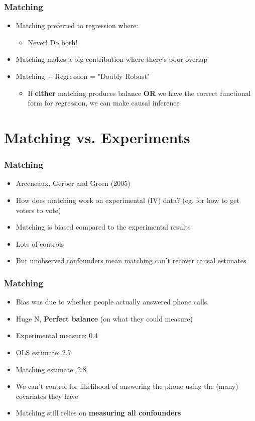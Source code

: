 \documentclass[xcolor=x11names,compress]{beamer}\usepackage[]{graphicx}\usepackage[]{color}
\renewcommand{\(}{\begin{columns}}
\renewcommand{\)}{\end{columns}}
\newcommand{\<}[1]{\begin{column}{#1}}
\renewcommand{\>}{\end{column}}
\begin{document}
\begin{frame}
\frametitle{Matching}
\begin{itemize}
\item Matching preferred to regression where:
\pause
\begin{itemize}
\item Never! Do both!
\end{itemize}
\item Matching makes a big contribution where there's poor overlap
\pause
\item Matching + Regression = "Doubly Robust"
\pause
\begin{itemize}
\item If \textbf{either} matching produces balance \textbf{OR} we have the correct functional form for regression, we can make causal inference
\end{itemize}
\end{itemize}
\end{frame}

\section{Matching vs. Experiments}

\begin{frame}
\frametitle{Matching}
\begin{itemize}
\item Arceneaux, Gerber and Green (2005)
\pause
\item How does matching work on experimental (IV) data? (eg. for how to get voters to vote)
\pause
\item Matching is biased compared to the experimental results
\pause
\item Lots of controls 
\pause
\item But unobserved confounders mean matching can't recover causal estimates
\end{itemize}
\end{frame}

\begin{frame}
\frametitle{Matching}
\begin{itemize}
\item Bias was due to whether people actually answered phone calls
\pause
\item Huge N, \textbf{Perfect balance} \pause (on what they could measure)
\pause
\item Experimental measure: 0.4
\pause
\item OLS estimate: 2.7
\pause
\item Matching estimate: 2.8
\pause
\item We can't control for likelihood of answering the phone using the (many) covariates they have
\pause
\item Matching still relies on \textbf{measuring all confounders}
\end{itemize}
\end{frame}
\end{document}
